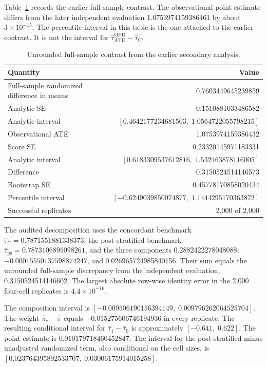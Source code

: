 \documentclass[11pt]{article}
\begin{document}
Table~\ref{tab:exact-secondary} records the earlier full-sample contrast. The observational point estimate differs from the later independent evaluation 1.0753974159386461 by about $3\times 10^{-15}$. The percentile interval in this table is the one attached to the earlier contrast. It is not the interval for $\widehat\tau^{\mathrm{QED}}_{\mathrm{ATE}}-\widehat\tau_C$.

\begin{table}[ht]
\centering
\caption{Unrounded full-sample contrast from the earlier secondary analysis.}
\label{tab:exact-secondary}
\small
\begin{tabular}{lr}
\toprule
Quantity & Value \\
\midrule
Full-sample randomized difference in means & 0.7603449645239859 \\
Analytic SE & 0.1510881033486582 \\
Analytic interval & $[0.4642177234681503,\; 1.0564722055798215]$ \\
Observational ATE & 1.0753974159386432 \\
Score SE & 0.23320145971183331 \\
Analytic interval & $[0.6183309537612816,\; 1.532463878116005]$ \\
Difference & 0.3150524514146573 \\
Bootstrap SE & 0.45778170858020434 \\
Percentile interval & $[-0.6249039850074877,\; 1.1444295170363872]$ \\
Successful replicates & 2{,}000 of 2{,}000 \\
\bottomrule
\end{tabular}
\end{table}

The audited decomposition uses the concordant benchmark $\widehat\tau_C=0.7871551881338373$, the post-stratified benchmark $\widehat\tau_{\mathrm{ps}}=0.7873106895098261$, and the three components 0.2882422278048088, $-0.00015550137598874247$, and 0.026965724985840156. Their sum equals the unrounded full-sample discrepancy from the independent evaluation, 0.3150524514146602. The largest absolute row-wise identity error in the 2{,}000 four-cell replicates is $4.4\times 10^{-16}$.

The composition interval is $[-0.009506190156394149,\; 0.009796262064525704]$. The weight $\widehat\pi_c-\widehat\pi$ equals $-0.015275606746194936$ in every replicate. The resulting conditional interval for $\widehat\tau_1-\widehat\tau_0$ is approximately $[-0.641,\; 0.622]$. The point estimate is $0.010179718460452847$. The interval for the post-stratified minus unadjusted randomized term, also conditional on the cell sizes, is $[0.023764395892533707,\; 0.03006175914015258]$.
\end{document}
